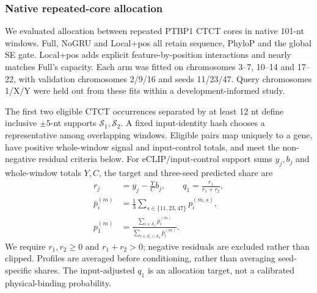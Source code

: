 \documentclass[webpdf,contemporary,large]{oup-authoring-template}
\begin{document}
\subsubsection{Native repeated-core allocation}\label{subsec:allocation_methods}

We evaluated allocation between repeated PTBP1 CTCT cores in native 101-nt windows. Full, NoGRU and Local+pos all retain sequence, PhyloP and the global SE gate. Local+pos adds explicit feature-by-position interactions and nearly matches Full's capacity. Each arm was fitted on chromosomes 3--7, 10--14 and 17--22, with validation chromosomes 2/9/16 and seeds 11/23/47. Query chromosomes 1/X/Y were held out from these fits within a development-informed study.

The first two eligible CTCT occurrences separated by at least 12 nt define inclusive $\pm5$-nt supports $\mathcal S_1,\mathcal S_2$. A fixed input-identity hash chooses a representative among overlapping windows. Eligible pairs map uniquely to a gene, have positive whole-window signal and input-control totals, and meet the non-negative residual criteria below. For eCLIP/input-control support sums $y_j,b_j$ and whole-window totals $Y,C$, the target and three-seed predicted share are
\begin{equation}
\begin{aligned}
r_j&=y_j-\frac{Y}{C}b_j,\qquad
q_1=\frac{r_1}{r_1+r_2},\\
\bar p_i^{(m)}&=\frac13\sum_{s\in\{11,23,47\}}p_i^{(m,s)},\\
p_1^{(m)}&=
\frac{\sum_{i\in\mathcal S_1}\bar p_i^{(m)}}
{\sum_{i\in\mathcal S_1\cup\mathcal S_2}\bar p_i^{(m)}}.
\end{aligned}
\label{eq:allocation_readout}
\end{equation}
We require $r_1,r_2\geq0$ and $r_1+r_2>0$; negative residuals are excluded rather than clipped. Profiles are averaged before conditioning, rather than averaging seed-specific shares. The input-adjusted $q_1$ is an allocation target, not a calibrated physical-binding probability.
\end{document}
